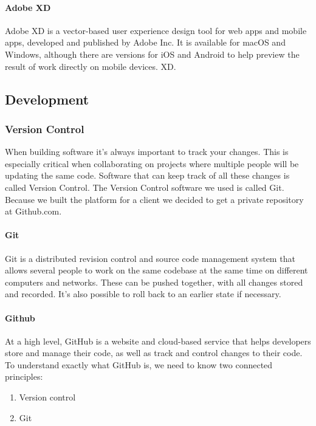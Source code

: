 \paragraph{Adobe XD}
Adobe XD is a vector-based user experience design tool for web apps and mobile apps, developed and published by Adobe Inc. It is available for macOS and Windows, although there are versions for iOS and Android to help preview the result of work directly on mobile devices. XD.












\subsection{Development}
\subsubsection{Version Control}
When building software it’s always important to track your changes. This is especially critical when collaborating on projects where multiple people will be updating the same code. Software that can keep track of all
these changes is called Version Control. The Version Control software we used is called Git. Because we built
the platform for a client we decided to get a private repository at Github.com.

\paragraph{Git}
Git is a distributed revision control and source code management system that
allows several people to work on the same codebase at the same time on different
computers and networks. These can be pushed together, with all changes stored and
recorded. It’s also possible to roll back to an earlier state if necessary.
\paragraph{Github}
At a high level, GitHub is a website and cloud-based service that helps developers store and manage their code, as well as track and control changes to their code. To understand exactly what GitHub is, we need to know two connected principles:
\begin{enumerate}
      \item Version control
      \item Git
\end{enumerate}

